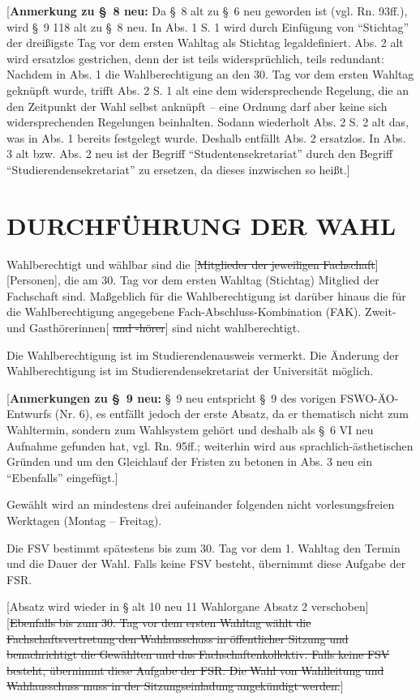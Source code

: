 \documentclass[%
draft,%
multilinesections%
]{fswo}
\newcommand\oldT[1]  {{\color{Gray}[\st{#1}]}}
\newcommand\newT[1]  {{\color{Green}[#1]}}
\newcommand\bemFr[1] {{\color{Red}[#1]}}
\newcommand\bemTi[1] {{\color{Cyan}[#1]}} %
\newcommand\oldT[1]{}%
\newcommand\newT[1]{#1}
\newcommand\bemFr[1]{}%
\newcommand\bemTi[1]{}%
\newcommand\change[2]{\oldT{#1}\newT{#2}}
\begin{document}
\bemFr{\textbf{Anmerkung zu \S~8 neu:} Da \S~8 alt zu \S~6 neu geworden ist (vgl. Rn. 93ff.), wird \S~9 118 alt zu \S~8 neu. In Abs. 1 S. 1 wird durch Einfügung von \enquote{Stichtag} der dreißigste Tag vor dem ersten Wahltag als Stichtag legaldefiniert. Abs. 2 alt wird ersatzlos gestrichen, denn der ist teils widersprüchlich, teils redundant:
Nachdem in Abs. 1 die Wahlberechtigung an den 30. Tag vor dem ersten Wahltag geknüpft wurde, trifft Abs. 2 S. 1 alt eine dem widersprechende Regelung, die an den Zeitpunkt der Wahl selbst anknüpft -- eine Ordnung darf aber keine sich widersprechenden Regelungen beinhalten.
Sodann wiederholt Abs. 2 S. 2 alt das, was in Abs. 1 bereits festgelegt wurde.
Deshalb entfällt Abs. 2 ersatzlos. In Abs. 3 alt bzw. Abs. 2 neu ist der Begriff \enquote{Studentensekretariat} durch den Begriff \enquote{Studierendensekretariat} zu ersetzen, da dieses inzwischen so heißt.}

\section{DURCHFÜHRUNG DER WAHL}

\begin{contract}
Wahlberechtigt und wählbar sind die \change{Mitglieder der jeweiligen Fachschaft}{Personen}, die am 30. Tag vor dem ersten Wahltag (Stichtag) Mitglied der Fachschaft sind.
Maßgeblich für die Wahlberechtigung ist darüber hinaus die für die Wahlberechtigung angegebene Fach-Abschluss-Kombination (FAK).
Zweit- und Gasthörerinnen\oldT{ und -hörer} sind nicht wahlberechtigt.

Die Wahlberechtigung ist im Studierendenausweis vermerkt.
Die Änderung der Wahlberechtigung ist im Studierendensekretariat der Universität möglich.
\end{contract}

\bemFr{\textbf{Anmerkungen zu \S~9 neu:}
\S~9 neu entspricht \S~9 des vorigen FSWO-ÄO-Entwurfs (Nr. 6), es entfällt jedoch der erste Absatz, da er thematisch nicht zum Wahltermin, sondern zum Wahlsystem gehört
und deshalb als \S~6 VI neu Aufnahme gefunden hat, vgl. Rn. 95ff.;
weiterhin wird aus sprachlich-ästhetischen Gründen und um den Gleichlauf der Fristen zu betonen in Abs. 3 neu ein \enquote{Ebenfalls} eingefügt.}

\begin{contract}
Gewählt wird an mindestens drei aufeinander folgenden nicht vorlesungsfreien Werktagen (Montag -- Freitag).

Die FSV bestimmt spätestens bis zum 30. Tag vor dem 1. Wahltag den Termin und die Dauer der Wahl.
Falls keine FSV besteht, übernimmt diese Aufgabe der FSR.


\bemTi{Absatz wird wieder in § alt 10 neu 11 Wahlorgane Absatz 2 verschoben}
\oldT{Ebenfalls bis zum 30. Tag vor dem ersten Wahltag wählt die Fachschaftsvertretung den Wahlausschuss in öffentlicher Sitzung und benachrichtigt die Gewählten und das Fachschaftenkollektiv.
Falls keine FSV besteht, übernimmt diese Aufgabe der FSR.
Die Wahl von Wahlleitung und Wahlausschuss muss in der Sitzungseinladung angekündigt werden.}
\end{contract}
\end{document}
